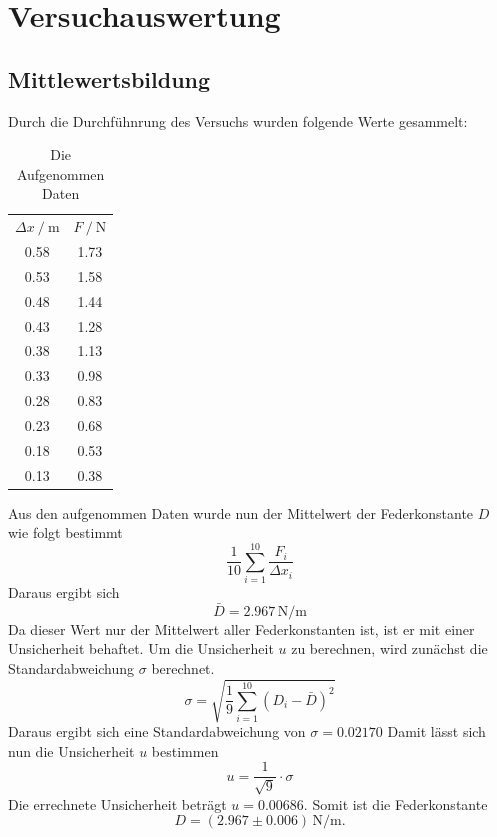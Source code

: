   \section{Versuchauswertung}
  \subsection{Mittlewertsbildung}
Durch die Durchfühnrung des Versuchs wurden folgende Werte gesammelt:
\begin{table}
  \centering
  \caption{Die Aufgenommen Daten}
  \label{tab:Messdaten}
  \begin{tabular}{c c}
  \toprule
  $ \Delta x \:/\: \si{\meter}$ & $F \:/\: \si{\newton}$ \\
  0.58 & 1.73 \\
  0.53 & 1.58 \\
  0.48 & 1.44 \\
  0.43 & 1.28 \\
  0.38 & 1.13 \\
  0.33 & 0.98 \\
  0.28 & 0.83 \\
  0.23 & 0.68 \\
  0.18 & 0.53 \\
  0.13 & 0.38 \\
  \bottomrule
  \end{tabular}
\end{table}
\FloatBarrier
Aus den aufgenommen Daten wurde nun der Mittelwert der Federkonstante $D$ wie folgt bestimmt
\begin{equation}
\frac{1}{10} \sum_{i=1}^{10} \frac{F_i}{\Delta x_i}
\end{equation}
Daraus ergibt sich
\begin{equation}
\bar{D} = 2.967 \,\mathrm{N/m}
\end{equation}
Da dieser Wert nur der Mittelwert aller Federkonstanten ist, ist er mit einer Unsicherheit behaftet.
Um die Unsicherheit $u$ zu berechnen, wird zunächst die Standardabweichung $\sigma$ berechnet.
\begin{equation}
\sigma = \sqrt{\frac{1}{9} \sum_{i=1}^{10} (D_i - \bar{D})^2}
\end{equation}
Daraus ergibt sich eine Standardabweichung von $\sigma = 0.02170$
Damit lässt sich nun die Unsicherheit $u$ bestimmen
\begin{equation}
u = \frac{1}{ \sqrt{9}} \cdot \sigma
\end{equation}
Die errechnete Unsicherheit beträgt $u = 0.00686$.
Somit ist die Federkonstante 
\begin{equation}
D = (2.967 \pm 0.006)\,\mathrm{N/m}.
\end{equation}
\newpage
